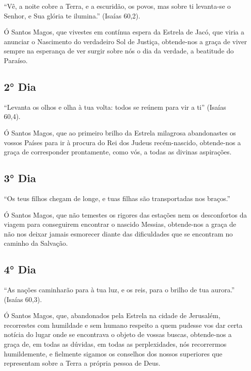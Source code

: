 \documentclass[18pt]{article}
\begin{document}
“Vê, a noite cobre a Terra, e a escuridão, os povos, mas sobre ti levanta-se o Senhor, e Sua glória te ilumina.” (Isaías 60,2). 

Ó Santos Magos, que vivestes em contínua espera da Estrela de Jacó, que viria a anunciar o Nascimento do verdadeiro Sol de Justiça, obtende-nos a graça de viver sempre na esperança de ver surgir sobre nós o dia da verdade, a beatitude do Paraíso. 



\textbf{}


\subsection{2° Dia}

“Levanta os olhos e olha à tua volta: todos se reúnem para vir a ti” (Isaías 60,4).  

Ó Santos Magos, que ao primeiro brilho da Estrela milagrosa abandonastes os vossos Países para ir à procura do Rei dos Judeus recém-nascido, obtende-nos a graça de corresponder prontamente, como vós, a todas as divinas aspirações. 


\textbf{}


\subsection{3° Dia}

“Os teus filhos chegam de longe, e tuas filhas são transportadas nos braços.” 

Ó Santos Magos, que não temestes os rigores das estações nem os desconfortos da viagem para conseguirem encontrar o nascido Messias, obtende-nos a graça de não nos deixar jamais esmorecer diante das dificuldades que se encontram no caminho da Salvação.


\textbf{}


\subsection{4° Dia}

“As nações caminharão para à tua luz, e os reis, para o brilho de tua aurora.” (Isaías 60,3).

Ó Santos Magos, que, abandonados pela Estrela na cidade de Jerusalém, recorrestes com humildade e sem humano respeito a quem pudesse vos dar certa notícia do lugar onde se encontrava o objeto de vossas buscas, obtende-nos a graça de, em todas as dúvidas, em todas as perplexidades, nós recorrermos humildemente, e fielmente sigamos os conselhos dos nossos superiores que representam sobre a Terra a própria pessoa de Deus. 
\end{document}
